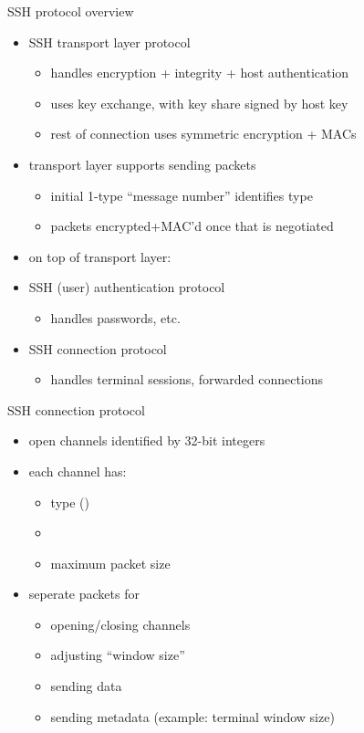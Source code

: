 \begin{frame}{SSH protocol overview}
    \begin{itemize}
    \item SSH transport layer protocol
        \begin{itemize}
        \item handles encryption + integrity + host authentication
        \item uses key exchange, with key share signed by host key
        \item rest of connection uses symmetric encryption + MACs 
        \end{itemize}
    \item transport layer supports sending packets
        \begin{itemize}
        \item initial 1-type ``message number'' identifies type
        \item packets encrypted+MAC'd once that is negotiated
        \end{itemize}
    \item on top of transport layer:
    \item SSH (user) authentication protocol
        \begin{itemize}
        \item handles passwords, etc.
        \end{itemize}
    \item SSH connection protocol
        \begin{itemize}
        \item handles terminal sessions, forwarded connections
        \end{itemize}
    \end{itemize}
\end{frame}

\begin{frame}{SSH connection protocol}
\begin{itemize}
    \item open channels identified by 32-bit integers
    \item each channel has:
        \begin{itemize}
        \item type ()
        \item {}
        \item maximum packet size
        \end{itemize}
    \item seperate packets for
        \begin{itemize}
        \item opening/closing channels
        \item adjusting ``window size''
        \item sending data
        \item sending metadata (example: terminal window size)
        \end{itemize}
    \end{itemize}
\end{frame}

